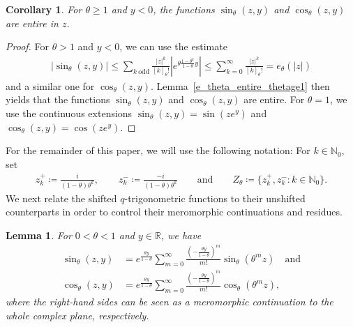 \documentclass[10pt,a4paper]{amsart}
\newcommand{\N}{\mathbb{N}} %
\newcommand{\R}{\mathbb{R}} %
\newcommand{\1}{\mathds{1}}
\newtheorem{Lemma}[definition]{Lemma}
\newtheorem{Corollary}[definition]{Corollary}
\begin{document}
 \begin{Corollary}\label{sine_and_cose_prelim}
      For $\theta\ge1$ and $y<0$, the functions $\sin_\theta(z,y)$ and $\cos_\theta(z,y)$ are entire in $z$.
 \end{Corollary}
 \begin{proof}
    For $\theta>1$ and $y<0$, we can use the estimate
\begin{align*}
    |\sin_{\theta}(z, y)|\leq \sum_{k~\text{odd}}\frac{|z|^{k}}{[k]_{\theta}!}|e^{\theta\frac{1-\theta^{k}}{1-\theta} y}|\leq \sum_{k=0}^\infty\frac{|z|^{k}}{[k]_{\theta}!}=e_\theta(|z|)
\end{align*}
and a similar one for $\cos_{\theta}(z,y)$. Lemma~\ref{e_theta_entire_thetage1} then yields that the functions $\sin_\theta(z,y)$ and $\cos_\theta(z,y)$ are entire. For $\theta=1$, we use the continuous extensions $\sin_{\theta}(z, y)=\sin(ze^y)$ and $\cos_{\theta}(z, y)=\cos(ze^y)$.
 \end{proof}
For the remainder of this paper, we will use the following notation: For $k\in\N_0$, set
   \begin{align}\label{def_zk}
       z_k^+\coloneqq \frac{i}{(1-\theta)\theta^k},\qquad z_k^-\coloneqq \frac{-i}{(1-\theta)\theta^k}\qquad\text{and}\qquad Z_\theta\coloneqq \{z_k^+,z_k^-:k\in\N_0\}.
   \end{align}
   We next relate the shifted $q$-trigonometric functions to their unshifted counterparts in order to control their meromorphic continuations and residues.
 \begin{Lemma}\label{sin_e_and_cos_e_prelim}
    For $0<\theta<1$ and $y\in\R$, we have
     \begin{align}
         \sin_\theta(z,y)&=e^{\frac{\theta y}{1-\theta}}\sum_{m=0}^\infty\frac{\left(-\frac{\theta y}{1-\theta}\right)^m}{m!}\sin_\theta(\theta^m z)\quad\text{and}\label{meromorhpic_sin}
         \\\cos_\theta(z,y)&=e^{\frac{\theta y}{1-\theta}}\sum_{m=0}^\infty\frac{\left(-\frac{\theta y}{1-\theta}\right)^m}{m!}\cos_\theta(\theta^m z),\label{meromorhpic_cos}
     \end{align}
     where the right-hand sides can be seen as a meromorphic continuation to the whole complex plane, respectively.
 \end{Lemma}
\end{document}
